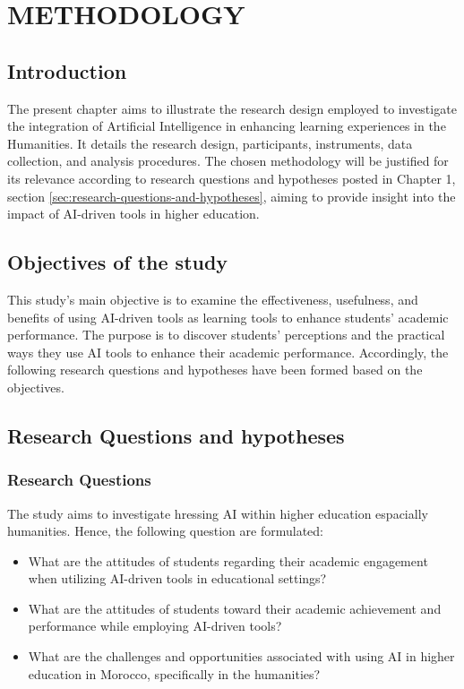 \chapter{METHODOLOGY}
\section{Introduction}
The present chapter aims to illustrate the research design employed to
investigate the integration of Artificial Intelligence in enhancing
learning experiences in the Humanities. It details the research design,
participants, instruments, data collection, and analysis procedures.
The chosen methodology will be justified for its relevance according
to research questions and hypotheses posted in Chapter 1, section \ref{sec:research-questions-and-hypotheses},
aiming to provide insight into the impact of AI-driven tools in higher education.
\section{Objectives of the study}
This study’s main objective is to examine the effectiveness,
usefulness, and benefits of using AI-driven tools as learning
tools to enhance students’ academic performance. The purpose is to
discover students’ perceptions and the practical ways they use AI
tools to enhance their academic performance. Accordingly,
the following research questions and hypotheses have been
formed based on the objectives.
\section{Research Questions and hypotheses}
\subsection{Research Questions}
The study aims to investigate hressing AI within higher education espacially humanities. Hence,
the following question are formulated:
\begin{itemize}
	\item What are the attitudes of students regarding their academic engagement when utilizing AI-driven tools in educational settings?
	\item What are the attitudes of students toward their academic achievement and performance while employing AI-driven tools?
	\item What are the challenges and opportunities associated
	      with using AI in higher education in Morocco,
	      specifically in the humanities?
\end{itemize}

